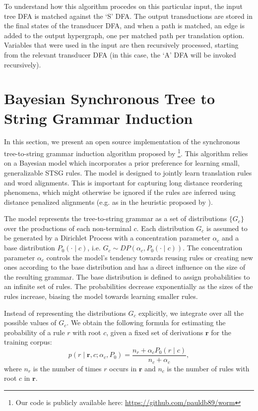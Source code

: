 \documentclass[nofonts]{pbml} %
\begin{document}
To understand how this algorithm procedes on this particular input, the input tree DFA is matched against the `S' DFA. The output transductions are stored in the final states of the transducer DFA, and when a path is matched, an edge is added to the output hypergraph, one per matched path per translation option. Variables that were used in the input are then recursively processed, starting from the relevant transducer DFA (in this case, the `A' DFA will be invoked recursively).

\section{Bayesian Synchronous Tree to String Grammar Induction}
\label{sec:bayes}

In this section, we present an open source implementation of the synchronous tree-to-string grammar induction algorithm proposed by \citet{Cohn2009} \footnote{Our code is publicly available here: \url{https://github.com/pauldb89/worm}}. This algorithm relies on a Bayesian model which incorporates a prior preference for learning small, generalizable STSG rules. The model is designed to jointly learn translation rules and word alignments. This is important for capturing long distance reordering phenomena, which might otherwise be ignored if the rules are inferred using distance penalized alignments (e.g. as in the heuristic proposed by \citet{Galley2004}).

The model represents the tree-to-string grammar as a set of distributions $\{G_c\}$ over the productions of each non-terminal $c$. Each distribution $G_c$ is assumed to be generated by a Dirichlet Process with a concentration parameter $\alpha_c$ and a base distribution $P_0(\cdot \mid c)$, i.e. $G_c \sim DP(\alpha_c, P_0(\cdot \mid c))$. The concentration parameter $\alpha_c$ controls the model's tendency towards reusing rules or creating new ones according to the base distribution and has a direct influence on the size of the resulting grammar. The base distribution is defined to assign probabilities to an infinite set of rules. The probabilities decrease exponentially as the sizes of the rules increase, biasing the model towards learning smaller rules.

Instead of representing the distributions $G_c$ explicitly, we integrate over all the possible values of $G_c$. We obtain the following formula for estimating the probability of a rule $r$ with root $c$, given a fixed set of derivations $\textbf{r}$ for the training corpus:
\begin{equation}
p(r \mid \textbf{r}, c; \alpha_c, P_0) = \frac{n_{r} + \alpha_c P_0(r \mid c)}{n_{c} + \alpha_c},
\label{eq:sampling}
\end{equation}
where $n_{r}$ is the number of times $r$ occurs in $\textbf{r}$ and $n_{c}$ is the number of rules with root $c$ in $\textbf{r}$.
\end{document}
